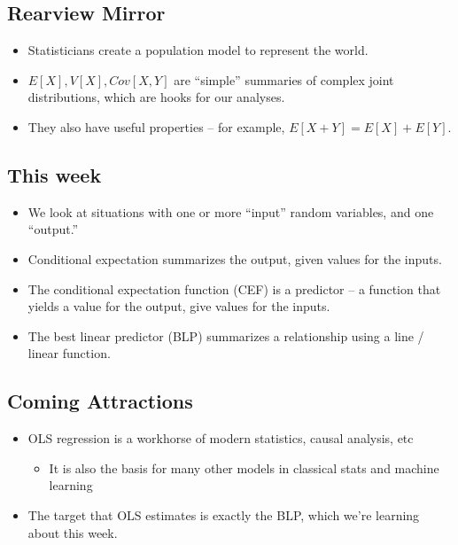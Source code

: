 \documentclass[
]{book}
\providecommand{\tightlist}{%
  \setlength{\itemsep}{0pt}\setlength{\parskip}{0pt}}
\theoremstyle{definition}
\theoremstyle{definition}
\theoremstyle{definition}
\theoremstyle{definition}
\theoremstyle{remark}
\begin{document}
\subsection{Rearview Mirror}\label{rearview-mirror}

\begin{itemize}
\tightlist
\item
  Statisticians create a population model to represent the world.
\item
  \(E[X], V[X], Cov[X,Y]\) are ``simple'' summaries of complex joint distributions, which are hooks for our analyses.
\item
  They also have useful properties -- for example, \(E[X + Y] = E[X] + E[Y]\).
\end{itemize}

\subsection{This week}\label{this-week}

\begin{itemize}
\tightlist
\item
  We look at situations with one or more ``input'' random variables, and one ``output.''
\item
  Conditional expectation summarizes the output, given values for the inputs.
\item
  The conditional expectation function (CEF) is a predictor -- a function that yields a value for the output, give values for the inputs.
\item
  The best linear predictor (BLP) summarizes a relationship using a line / linear function.
\end{itemize}

\subsection{Coming Attractions}\label{coming-attractions}

\begin{itemize}
\tightlist
\item
  OLS regression is a workhorse of modern statistics, causal analysis, etc

  \begin{itemize}
  \tightlist
  \item
    It is also the basis for many other models in classical stats and machine learning
  \end{itemize}
\item
  The target that OLS estimates is exactly the BLP, which we're learning about this week.
\end{itemize}
\end{document}
